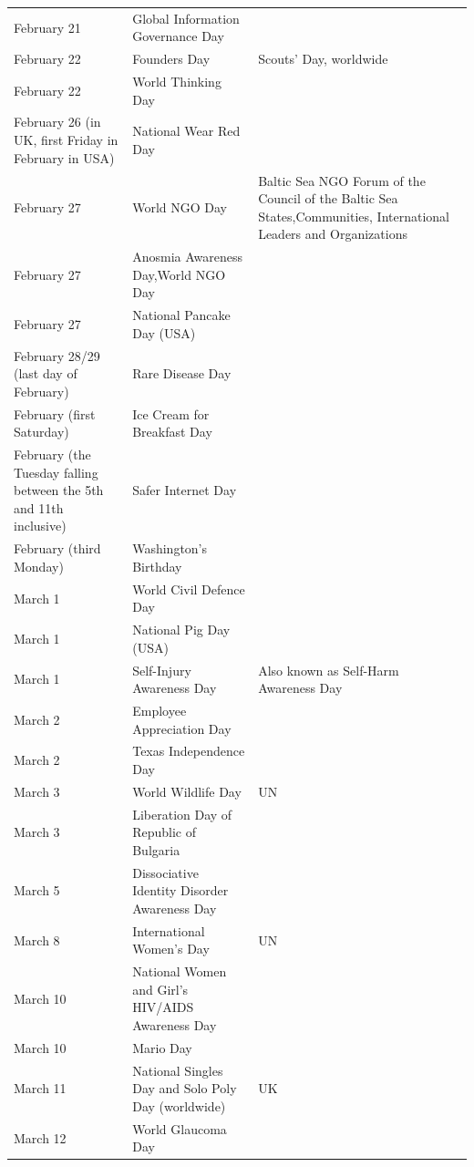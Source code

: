 \documentclass[
  openany]{book}
\begin{document}
\begin{longtable}[t]{>{\raggedright\arraybackslash}p{8em}>{\raggedright\arraybackslash}p{18em}>{\raggedright\arraybackslash}p{10em}}
\addlinespace
February 21 & Global Information Governance Day & \\
\rowcolor{gray!6}  February 22 & Founders Day & Scouts' Day, worldwide\\
February 22 & World Thinking Day & \\
\rowcolor{gray!6}  February 26 (in UK, first Friday in February in USA) & National Wear Red Day & \\
February 27 & World NGO Day & Baltic Sea NGO Forum of the Council of the Baltic Sea States,Communities, International Leaders and Organizations\\
\addlinespace
\rowcolor{gray!6}  February 27 & Anosmia Awareness Day,World NGO Day & \\
February 27 & National Pancake Day (USA) & \\
\rowcolor{gray!6}  February 28/29 (last day of February) & Rare Disease Day & \\
February (first Saturday) & Ice Cream for Breakfast Day & \\
\rowcolor{gray!6}  February (the Tuesday falling between the 5th and 11th inclusive) & Safer Internet Day & \\
\addlinespace
February (third Monday) & Washington's Birthday & \\
\rowcolor{gray!6}  March 1 & World Civil Defence Day & \\
March 1 & National Pig Day (USA) & \\
\rowcolor{gray!6}  March 1 & Self-Injury Awareness Day & Also known as Self-Harm Awareness Day\\
March 2 & Employee Appreciation Day & \\
\addlinespace
\rowcolor{gray!6}  March 2 & Texas Independence Day & \\
March 3 & World Wildlife Day & UN\\
\rowcolor{gray!6}  March 3 & Liberation Day of Republic of Bulgaria & \\
March 5 & Dissociative Identity Disorder Awareness Day & \\
\rowcolor{gray!6}  March 8 & International Women's Day & UN\\
\addlinespace
March 10 & National Women and Girl's HIV/AIDS Awareness Day & \\
\rowcolor{gray!6}  March 10 & Mario Day & \\
March 11 & National Singles Day and Solo Poly Day (worldwide) & UK\\
\rowcolor{gray!6}  March 12 & World Glaucoma Day & \\

\end{longtable}
\end{document}
